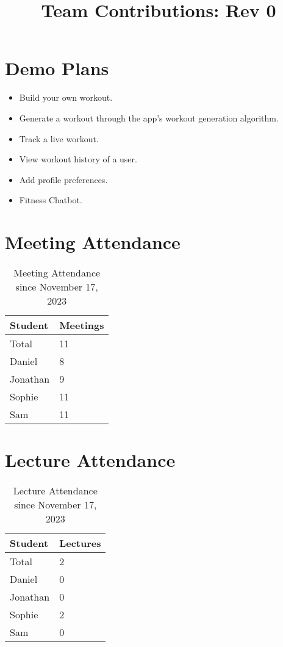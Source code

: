 \documentclass{article}
\title{Team Contributions: Rev 0\\\progname}
\author{\authname}
\date{}
\begin{document}
\maketitle

\section{Demo Plans}

\begin{itemize}
    \item Build your own workout.
    \item Generate a workout through the app's workout generation algorithm.
    \item Track a live workout.
    \item View workout history of a user.
    \item Add profile preferences.
    \item Fitness Chatbot.
\end{itemize}

\section{Meeting Attendance}

\begin{table}[H]
\centering
\begin{tabular}{ll}
\toprule
\textbf{Student} & \textbf{Meetings}\\
\midrule
Total & 11\\
Daniel & 8\\
Jonathan & 9\\
Sophie & 11\\
Sam & 11\\
\bottomrule
\end{tabular}
\caption{Meeting Attendance since November 17, 2023}
\end{table}

\section{Lecture Attendance}

\begin{table}[H]
\centering
\begin{tabular}{ll}
\toprule
\textbf{Student} & \textbf{Lectures}\\
\midrule
Total & 2\\
Daniel & 0\\
Jonathan & 0\\
Sophie & 2\\
Sam & 0\\
\bottomrule
\end{tabular}
\caption{Lecture Attendance since November 17, 2023}
\end{table}
\end{document}
